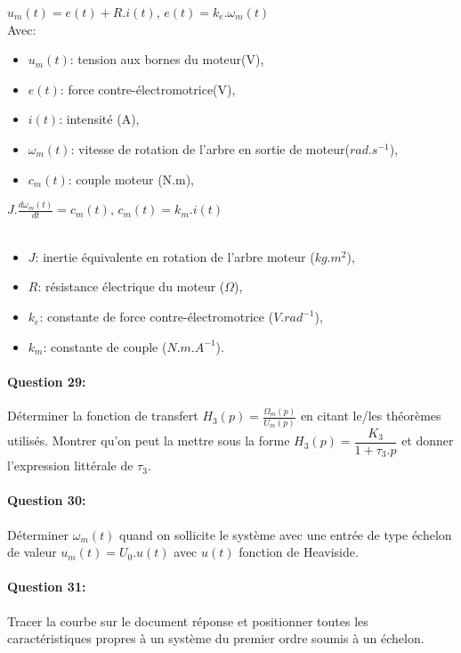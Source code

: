 \begin{minipage}[t]{0.45\linewidth}
$u_m(t)=e(t)+R.i(t)$, $e(t)=k_e.\omega_m(t)$ \\
Avec:
\begin{itemize}
 \item $u_m(t)$: tension aux bornes du moteur(V),
 \item $e(t)$: force contre-électromotrice(V),
 \item $i(t)$: intensité (A),
 \item $\omega_m(t)$: vitesse de rotation de l'arbre en sortie de moteur($rad.s^{-1}$),
 \item $c_m(t)$: couple moteur (N.m),
\end{itemize}
\end{minipage}\hfill
\begin{minipage}[t]{0.45\linewidth}
$J.\frac{d \omega_m(t)}{dt}=c_m(t)$, $c_m(t)=k_m.i(t)$ \\
~\
\begin{itemize}
 \item $J$: inertie équivalente en rotation de l'arbre moteur ($kg.m^2$),
 \item $R$: résistance électrique du moteur ($\Omega$),
 \item $k_e$: constante de force contre-électromotrice ($V.rad^{-1}$),
 \item $k_m$: constante de couple ($N.m.A^{-1}$).
\end{itemize}
\end{minipage}

\paragraph{Question 29:} Déterminer la fonction de transfert $H_3(p)=\frac{\Omega_m(p)}{U_m(p)}$ en citant le/les théorèmes utilisés. Montrer qu'on peut la mettre sous la forme $H_3(p)=\dfrac{K_3}{1+\tau_3.p}$ et donner l'expression littérale de $\tau_3$.

\paragraph{Question 30:} Déterminer $\omega_m(t)$ quand on sollicite le système avec une entrée de type échelon de valeur $u_m(t)=U_0.u(t)$ avec $u(t)$ fonction de Heaviside.

\paragraph{Question 31:} Tracer la courbe sur le document réponse et positionner toutes les caractéristiques propres à un système du premier ordre soumis à un échelon.

